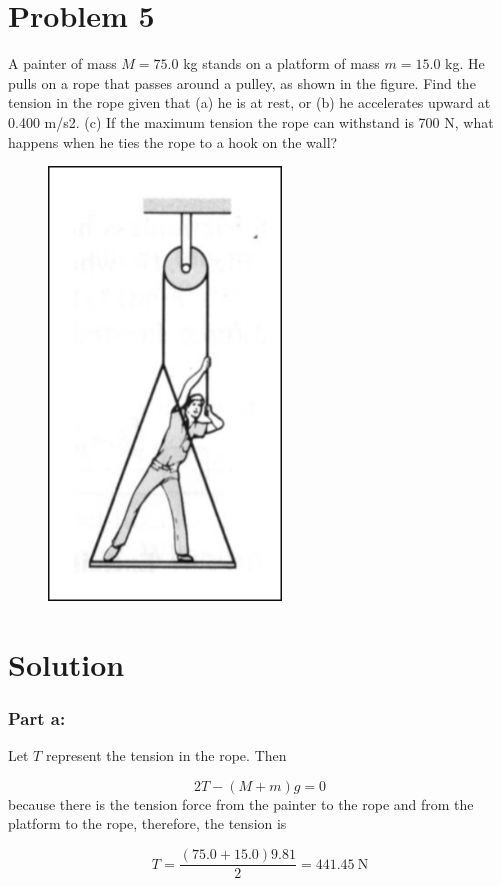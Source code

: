 \documentclass{article}
\begin{document}
\section*{Problem 5}
A painter of mass $M = 75.0$ kg stands on a platform of mass $m = 15.0$ kg. He pulls on a rope that passes
around a pulley, as shown in the figure. Find the tension in the rope given that (a) he is at rest, or (b) he
accelerates upward at 0.400 m/s2. (c) If the maximum tension the rope can withstand is 700 N, what happens
when he ties the rope to a hook on the wall?
\begin{figure}[ht]
    \centering
    \includegraphics[scale=.4]{drawing-3.png}
\end{figure}

\section*{Solution}
\subsubsection*{Part a:}
Let $T$ represent the tension in the rope. Then

\[
	2T - \left( M + m \right)g = 0
\]
because there is the tension force from the painter to the rope and from the platform to the rope, therefore, the tension is

\[
	T = \frac{\left( 75.0 + 15.0 \right)9.81}{2} = \boxed{441.45\ \text{N}}
\]
\end{document}
